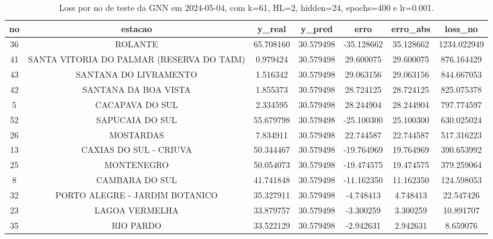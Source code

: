 \begin{table}[h]
\centering
\caption{Loss por no de teste da GNN em 2024-05-04, com k=61, HL=2, hidden=24, epochs=400 e lr=0.001.}
\label{tab:gnn_loss_k61_hl2_h24_e400_d20240504}
\begin{tabular}{ccccccc}
\toprule
no & estacao & y\_real & y\_pred & erro & erro\_abs & loss\_no \\
\midrule
36 & ROLANTE & 65.708160 & 30.579498 & -35.128662 & 35.128662 & 1234.022949 \\
41 & SANTA VITORIA DO PALMAR (RESERVA DO TAIM) & 0.979424 & 30.579498 & 29.600075 & 29.600075 & 876.164429 \\
43 & SANTANA DO LIVRAMENTO & 1.516342 & 30.579498 & 29.063156 & 29.063156 & 844.667053 \\
42 & SANTANA DA BOA VISTA & 1.855373 & 30.579498 & 28.724125 & 28.724125 & 825.075378 \\
5 & CACAPAVA DO SUL & 2.334595 & 30.579498 & 28.244904 & 28.244904 & 797.774597 \\
52 & SAPUCAIA DO SUL & 55.679798 & 30.579498 & -25.100300 & 25.100300 & 630.025024 \\
26 & MOSTARDAS & 7.834911 & 30.579498 & 22.744587 & 22.744587 & 517.316223 \\
13 & CAXIAS DO SUL - CRIUVA & 50.344467 & 30.579498 & -19.764969 & 19.764969 & 390.653992 \\
25 & MONTENEGRO & 50.054073 & 30.579498 & -19.474575 & 19.474575 & 379.259064 \\
8 & CAMBARA DO SUL & 41.741848 & 30.579498 & -11.162350 & 11.162350 & 124.598053 \\
32 & PORTO ALEGRE - JARDIM BOTANICO & 35.327911 & 30.579498 & -4.748413 & 4.748413 & 22.547426 \\
23 & LAGOA VERMELHA & 33.879757 & 30.579498 & -3.300259 & 3.300259 & 10.891707 \\
35 & RIO PARDO & 33.522129 & 30.579498 & -2.942631 & 2.942631 & 8.659076 \\
\bottomrule
\end{tabular}
\end{table}
